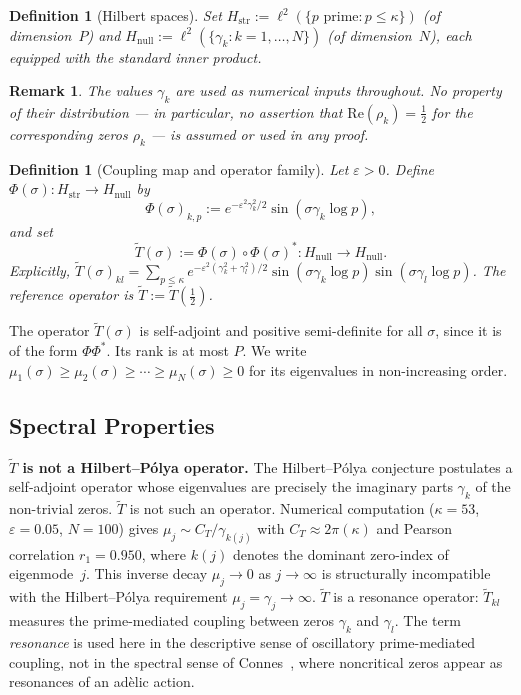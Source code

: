 \documentclass[11pt]{article}
\newtheorem{definition}[theorem]{Definition}
\newtheorem*{remark}{Remark}
\newcommand{\Hstr}{H_{\mathrm{str}}}
\newcommand{\Hnull}{H_{\mathrm{null}}}
\newcommand{\Tt}{\widetilde{T}}
\newcommand{\CT}{C_{T}}
\begin{document}
\begin{definition}[Hilbert spaces]
\label{def:spaces}
Set $\Hstr := \ell^2(\{p\text{ prime}: p\leq\kappa\})$
(of dimension~$P$) and $\Hnull := \ell^2(\{\gamma_k: k=1,\ldots,N\})$
(of dimension~$N$), each equipped with the standard inner product.
\end{definition}

\begin{remark}
The values $\gamma_k$ are used as numerical inputs throughout.
No property of their distribution --- in particular, no assertion
that $\mathrm{Re}(\rho_k)=\tfrac{1}{2}$ for the corresponding
zeros $\rho_k$ --- is assumed or used in any proof.
\end{remark}

\begin{definition}[Coupling map and operator family]
\label{def:coupling}
Let $\varepsilon>0$.
Define $\Phi(\sigma)\colon\Hstr\to\Hnull$ by
\[
\Phi(\sigma)_{k,p} := e^{-\varepsilon^2\gamma_k^2/2}\sin(\sigma\gamma_k\log p),
\]
and set
\[
\Tt(\sigma) := \Phi(\sigma)\circ\Phi(\sigma)^*\colon\Hnull\to\Hnull.
\]
Explicitly,
$\Tt(\sigma)_{kl}
  = \sum_{p\leq\kappa} e^{-\varepsilon^2(\gamma_k^2+\gamma_l^2)/2}
    \sin(\sigma\gamma_k\log p)\sin(\sigma\gamma_l\log p)$.
The reference operator is $\Tt := \Tt(\tfrac{1}{2})$.
\end{definition}

The operator $\Tt(\sigma)$ is self-adjoint and positive semi-definite
for all $\sigma$, since it is of the form $\Phi\Phi^*$.
Its rank is at most $P$.
We write $\mu_1(\sigma)\geq\mu_2(\sigma)\geq\cdots\geq\mu_N(\sigma)\geq 0$
for its eigenvalues in non-increasing order.

\subsection{Spectral Properties}
\label{ssec:spectral}

\textbf{$\Tt$ is not a Hilbert--P\'olya operator.}
The Hilbert--P\'olya conjecture postulates a self-adjoint operator
whose eigenvalues are precisely the imaginary parts $\gamma_k$ of the
non-trivial zeros.
$\Tt$ is not such an operator.
Numerical computation ($\kappa=53$, $\varepsilon=0.05$, $N=100$) gives
$\mu_j\sim\CT/\gamma_{k(j)}$ with $\CT\approx 2\pi(\kappa)$
and Pearson correlation $r_1=0.950$,
where $k(j)$ denotes the dominant zero-index of eigenmode~$j$.
This inverse decay $\mu_j\to 0$ as $j\to\infty$ is structurally
incompatible with the Hilbert--P\'olya requirement $\mu_j=\gamma_j\to\infty$.
$\Tt$ is a resonance operator: $\Tt_{kl}$ measures the prime-mediated
coupling between zeros $\gamma_k$ and $\gamma_l$.
The term \emph{resonance} is used here in the descriptive sense of
oscillatory prime-mediated coupling, not in the spectral sense of
Connes~\cite{Connes}, where noncritical zeros appear as resonances
of an ad\`elic action.
\end{document}
